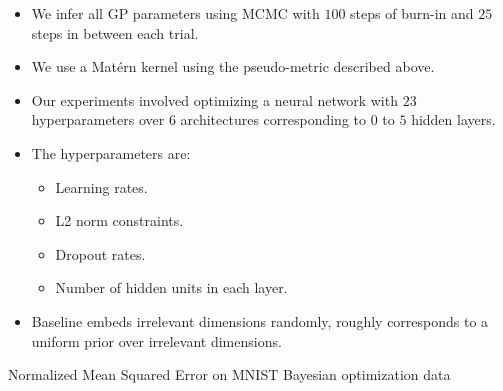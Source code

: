 \documentclass[landscape,a0b,final,a4resizeable]{include/a0poster}
\begin{document}
\begin{poster}
\begin{multicols}{3}
	\begin{itemize}
		\item We infer all GP parameters using MCMC with $100$ steps of burn-in and $25$ steps in between each trial.
		\item We use a Mat\'{e}rn kernel using the pseudo-metric described above.
		\item Our experiments involved optimizing a neural network with $23$ hyperparameters over $6$ architectures corresponding to $0$ to $5$ hidden layers.
		\item The hyperparameters are:
		\begin{itemize}
			\item Learning rates.
			\item L2 norm constraints.
			\item Dropout rates.
			\item Number of hidden units in each layer.
		\end{itemize}
		\item Baseline embeds irrelevant dimensions randomly, roughly corresponds to a uniform prior over irrelevant dimensions.
	\end{itemize}




\newpage





\begin{minipage}[c]{0.95\columnwidth}


Normalized Mean Squared Error on MNIST Bayesian optimization data
%
\end{minipage}





\end{multicols}
\end{poster}
\end{document}
